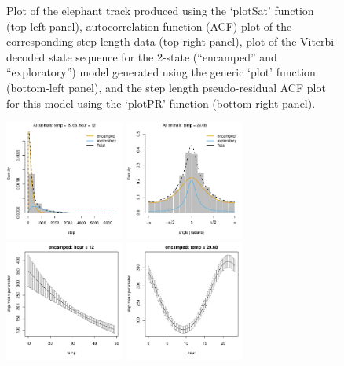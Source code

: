 \documentclass[12pt]{article}\usepackage[]{graphicx}\usepackage[]{color}
\begin{document}
\begin{figure}[htbp]
  \caption{Plot of the elephant track produced using the `plotSat' function (top-left panel), autocorrelation function (ACF) plot of the corresponding step length data (top-right panel), plot of the Viterbi-decoded state sequence for the 2-state (``encamped'' and ``exploratory'') model generated using the generic `plot' function (bottom-left panel), and the step length pseudo-residual ACF plot for this model using the `plotPR' function (bottom-right panel).}
  \label{fig:elephantResults1}
\end{figure}

\begin{figure}[htbp]
  \centering
  \includegraphics[width=0.35\textwidth]{plot_elephantResults009.pdf}
  \includegraphics[width=0.35\textwidth]{plot_elephantResults012.pdf} \\
  \includegraphics[width=0.35\textwidth]{plot_elephantResults001.pdf} 
  \includegraphics[width=0.35\textwidth]{plot_elephantResults002.pdf} \\

\end{figure}
\end{document}
